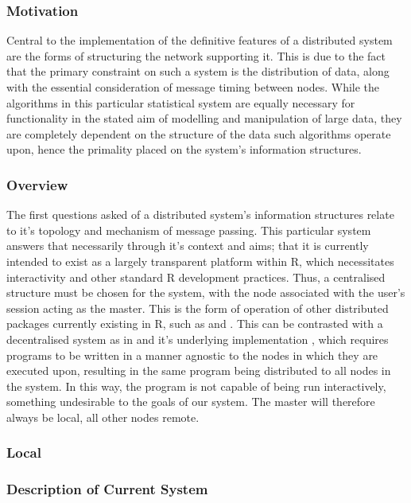 \subsubsection{Motivation}\label{motivation}

Central to the implementation of the definitive features of a
distributed system are the forms of structuring the network supporting it.
This is due to the fact that the primary constraint on such a system is
the distribution of data, along with the essential consideration of
message timing between nodes. While the algorithms in this particular
statistical system are equally necessary for functionality in the stated
aim of modelling and manipulation of large data, they are completely
dependent on the structure of the data such algorithms operate upon,
hence the primality placed on the system's information structures.

\subsubsection{Overview}\label{overview}

The first questions asked of a distributed system's information
structures relate to it's topology and mechanism of message passing.
This particular system answers that necessarily through it's context and
aims; that it is currently intended to exist as a largely transparent
platform within R, which necessitates interactivity and other standard R
development practices. Thus, a centralised structure must be chosen for
the system, with the node associated with the user's \R session acting as
the master. This is the form of operation of other distributed packages
currently existing in R, such as  and 
\cites{luraschi20,tierney18}. This can be contrasted with a
decentralised system as in  and it's underlying
 implementation \cite{pbdR2012}, which requires \R programs
to be written in a manner agnostic to the nodes in which they are
executed upon, resulting in the same program being distributed to all
nodes in the system. In this way, the program is not capable of being
run interactively, something undesirable to the goals of our system. The
master will therefore always be local, all other nodes remote.

\subsubsection{Local}\label{local}

\subsubsection{Description of Current System}\label{description-of-current-system}

